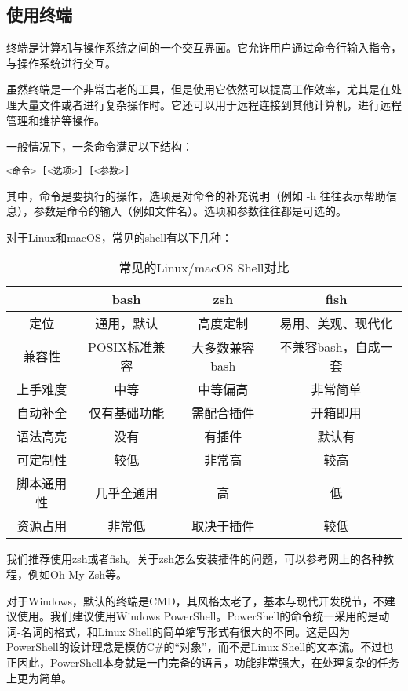 \subsection{使用终端}\label{sec:terminal}

终端是计算机与操作系统之间的一个交互界面。它允许用户通过命令行输入指令，与操作系统进行交互。

虽然终端是一个非常古老的工具，但是使用它依然可以提高工作效率，尤其是在处理大量文件或者进行复杂操作时。它还可以用于远程连接到其他计算机，进行远程管理和维护等操作。

一般情况下，一条命令满足以下结构：
\begin{lstlisting}[language=bash]
    <命令> [<选项>] [<参数>]
\end{lstlisting}

其中，命令是要执行的操作，选项是对命令的补充说明（例如 -h 往往表示帮助信息），参数是命令的输入（例如文件名）。选项和参数往往都是可选的。

对于Linux和macOS，常见的shell有以下几种：

\begin{table}[ht]
  \centering
  \begin{tabular}{c|ccc}
    \toprule
    & \textbf{bash} & \textbf{zsh} & \textbf{fish} \\
    \midrule
    定位 & 通用，默认 & 高度定制 & 易用、美观、现代化 \\
    兼容性 & POSIX标准兼容 & 大多数兼容bash & 不兼容bash，自成一套 \\
    上手难度 & 中等 & 中等偏高 & 非常简单 \\
    自动补全 & 仅有基础功能 & 需配合插件 & 开箱即用 \\
    语法高亮 & 没有 & 有插件 & 默认有 \\
    可定制性 & 较低 & 非常高 & 较高 \\
    脚本通用性 & 几乎全通用 & 高 & 低 \\
    资源占用 & 非常低 & 取决于插件 & 较低 \\
    \bottomrule
  \end{tabular}
  \caption{常见的Linux/macOS Shell对比}
\end{table}
我们推荐使用zsh或者fish。关于zsh怎么安装插件的问题，可以参考网上的各种教程，例如Oh My Zsh等。

对于Windows，默认的终端是CMD，其风格太老了，基本与现代开发脱节，不建议使用。我们建议使用Windows PowerShell。PowerShell的命令统一采用的是动词-名词的格式，和Linux Shell的简单缩写形式有很大的不同。这是因为PowerShell的设计理念是模仿C\#的“对象”，而不是Linux Shell的文本流。不过也正因此，PowerShell本身就是一门完备的语言，功能非常强大，在处理复杂的任务上更为简单。

